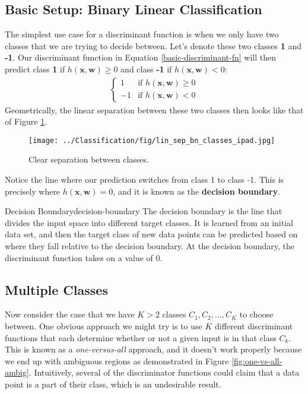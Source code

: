 \subsection{Basic Setup: Binary Linear Classification}
The simplest use case for a discriminant function is when we only have two classes that we are trying to decide between. Let's denote these two classes \textbf{1} and \textbf{-1}. Our discriminant function in Equation \ref{basic-discriminant-fn} will then predict class \textbf{1} if $h(\textbf{x}, \textbf{w}) \geq 0$ and class \textbf{-1} if $h(\textbf{x}, \textbf{w}) < 0$:
\begin{align*}
	\begin{cases} 
    	1 & \text{if } h(\textbf{x}, \textbf{w}) \geq 0 \\
    	-1 & \text{if } h(\textbf{x}, \textbf{w}) < 0
   \end{cases}
\end{align*}
Geometrically, the linear separation between these two classes then looks like that of Figure \ref{fig:lin-sep-bn-classes}.
\begin{figure}
    \centering
    \texttt{[image: ../Classification/fig/lin\_sep\_bn\_classes\_ipad.jpg]}
    \caption{Clear separation between classes.}
    \label{fig:lin-sep-bn-classes}
\end{figure}
Notice the line where our prediction switches from class 1 to class -1. This is precisely where $h(\textbf{x}, \textbf{w}) = 0$, and it is known as the \textbf{decision boundary}.

\begin{definition}{Decision Boundary}{decision-boundary}
	The decision boundary is the line that divides the input space into different target classes. It is learned from an initial data set, and then the target class of new data points can be predicted based on where they fall relative to the decision boundary. At the decision boundary, the discriminant function takes on a value of 0.
\end{definition}


\subsection{Multiple Classes}
Now consider the case that we have $K > 2$ classes $C_{1}, C_{2}, ..., C_{K}$ to choose between. One obvious approach we might try is to use $K$ different discriminant functions that each determine whether or not a given input is in that class $C_{k}$. This is known as a \textit{one-versus-all} approach, and it doesn't work properly because we end up with ambiguous regions as demonstrated in Figure \ref{fig:one-vs-all-ambig}. Intuitively, several of the discriminator functions could claim that a data point is a part of their class, which is an undesirable result.

